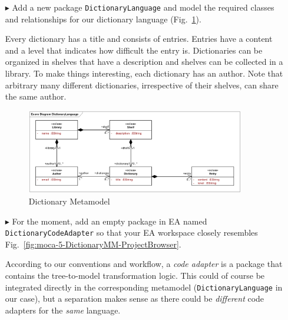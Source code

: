 \begin{enumerate}

\item[$\blacktriangleright$] Add a new package \texttt{DictionaryLanguage} and model the required classes and relationships for our dictionary language (Fig.~\ref{fig:moca-5-DictionaryMM}).

Every dictionary has a title and consists of entries.
Entries have a content and a level that indicates how difficult the entry is.
Dictionaries can be organized in shelves that have a description and shelves can be collected in a library.
To make things interesting, each dictionary has an author.
Note that arbitrary many different dictionaries, irrespective of their shelves, can share the same author.

\begin{figure}[!htbp]
\begin{center}
 \includegraphics[width=0.9\textwidth]{pics/moca/1DictionaryMetaModel/DictionaryLanguage}
  \caption{Dictionary Metamodel}
  \label{fig:moca-5-DictionaryMM}
\end{center}
\end{figure}

\item[$\blacktriangleright$] For the moment, add an empty package in EA named \texttt{Dic\-tion\-ary\-Code\-Adapter} so that your EA workspace closely resembles Fig.~\ref{fig:moca-5-DictionaryMM-ProjectBrowser}.

According to our conventions and workflow, a \emph{code adapter} is a package that contains the tree-to-model transformation logic.
This could of course be integrated directly in the corresponding metamodel (\texttt{Dic\-tion\-ary\-Language} in our case), but a separation makes sense as there could be \emph{different} code adapters for the \emph{same} language.



\end{enumerate}
